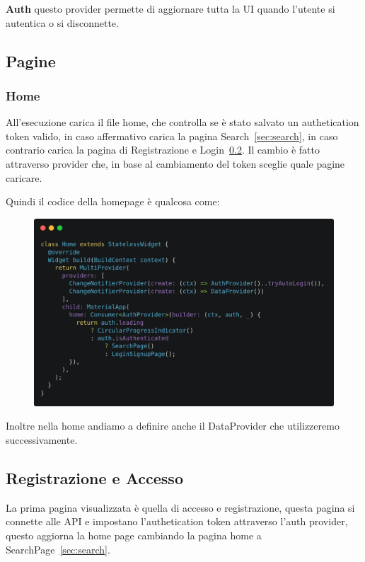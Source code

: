 \documentclass[a4paper,12pt]{article}
\begin{document}
\textbf{Auth} questo provider permette di aggiornare tutta la UI quando l'utente si autentica o si disconnette.

\newpage

\subsection{Pagine}

\subsubsection{Home}


All'esecuzione carica il file home, che controlla se è stato salvato un authetication token valido, in caso affermativo carica la pagina Search~\ref{sec:search}, in caso contrario carica la pagina di Registrazione e Login~\ref{sec:login}. Il cambio è fatto attraverso provider che, in base al cambiamento del token sceglie quale pagine caricare.

Quindi il codice della homepage è qualcosa come:

\begin{figure}[h]
    \centering
        \includegraphics[width=0.9\linewidth]{img/home.png}
\end{figure}


Inoltre nella home andiamo a definire anche il DataProvider che utilizzeremo successivamente.

\newpage

\subsection{Registrazione e Accesso}
\label{sec:login}

La prima pagina visualizzata è quella di accesso e registrazione, questa pagina si connette alle API e impostano l'authetication token attraverso l'auth provider, questo aggiorna la home page cambiando la pagina home a SearchPage~\ref{sec:search}.
\end{document}

